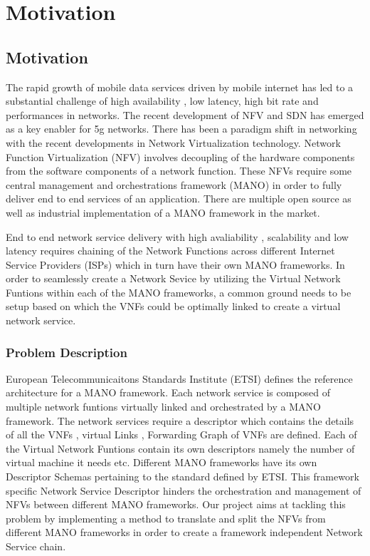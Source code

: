 \chapter{Motivation}
\label{ch:Motivation}

\section{Motivation}

The rapid growth of mobile data services driven by mobile internet has led to a substantial challenge of high availability , low latency, high bit rate and performances in networks. The recent development of NFV and SDN has emerged as a key enabler for 5g networks. 
There has been a paradigm shift in networking with the recent developments in Network Virtualization technology. Network Function Virtualization (NFV) involves decoupling of the hardware components from the software components of a network function. These NFVs require some central management and orchestrations framework (MANO) in order to fully deliver end to end services of an application. There are multiple open source as well as industrial implementation of a  MANO framework in the market. 

End to end network service delivery with high avaliability , scalability and low latency requires chaining of the Network Functions across different Internet Service Providers (ISPs) which in turn have their own MANO frameworks. In order to seamlessly create a Network Sevice by utilizing the Virtual Network Funtions within each of the MANO frameworks, a common ground needs to be setup based on which the VNFs could be optimally linked to create a virtual network service.


\subsection{Problem Description}

European Telecommunicaitons Standards Institute (ETSI) defines the reference architecture for a MANO framework. Each network service is composed of multiple network funtions virtually linked and orchestrated by a MANO framework. The network services require a descriptor which contains the details of all the VNFs , virtual Links , Forwarding Graph of VNFs are defined. Each of the Virtual Network Funtions contain its own descriptors namely the number of virtual machine it needs etc. Different MANO frameworks have its own Descriptor Schemas pertaining to the standard defined by ETSI. This framework specific Network Service Descriptor hinders the orchestration and management of NFVs between different MANO frameworks. Our project aims at tackling this problem by implementing a method to translate and split the NFVs from different MANO frameworks in order to create a framework independent Network Service chain.

